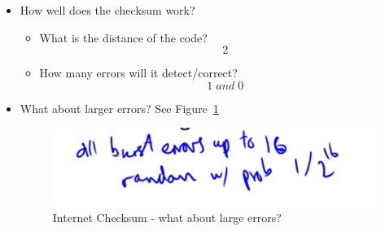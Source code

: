 \documentclass[12pt]{ctexart}   %
\begin{document}
\begin{itemize}
		\item How well does the checksum work?
		\begin{itemize}
			\item What is the distance of the code?
			$$
			2
			$$
			\item How many errors will it detect/correct?
			$$
			1 \; and \; 0
			$$
		\end{itemize}
		
		\item What about larger errors? See Figure~\ref{fig:2-9-5}
		
		\begin{figure}[h!] %
		\centering
		 \includegraphics[scale=0.7]{images/2-9-5}
		\caption{Internet Checksum - what about large errors?}
		 \label{fig:2-9-5}
		 \end{figure}
		 
	\end{itemize}
	
\end{document}
